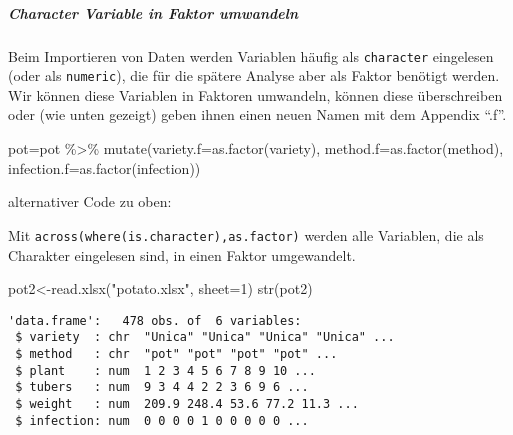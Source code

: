 \documentclass[
  letterpaper,
  DIV=11,
  numbers=noendperiod]{scrartcl}
\let\oldsubparagraph\subparagraph
\renewcommand{\subparagraph}[1]{\oldsubparagraph{#1}\mbox{}}
\newenvironment{Shaded}{\begin{snugshade}}{\end{snugshade}}
\newcommand{\AttributeTok}[1]{\textcolor[rgb]{0.40,0.45,0.13}{#1}}
\newcommand{\DecValTok}[1]{\textcolor[rgb]{0.68,0.00,0.00}{#1}}
\newcommand{\FunctionTok}[1]{\textcolor[rgb]{0.28,0.35,0.67}{#1}}
\newcommand{\NormalTok}[1]{\textcolor[rgb]{0.00,0.23,0.31}{#1}}
\newcommand{\OtherTok}[1]{\textcolor[rgb]{0.00,0.23,0.31}{#1}}
\newcommand{\SpecialCharTok}[1]{\textcolor[rgb]{0.37,0.37,0.37}{#1}}
\newcommand{\StringTok}[1]{\textcolor[rgb]{0.13,0.47,0.30}{#1}}
\begin{document}
\hypertarget{sec-mutate}{%
\subparagraph{Character Variable in Faktor umwandeln}\label{sec-mutate}}

Beim Importieren von Daten werden Variablen häufig als
\texttt{character} eingelesen (oder als \texttt{numeric}), die für die
spätere Analyse aber als Faktor benötigt werden. Wir können diese
Variablen in Faktoren umwandeln, können diese überschreiben oder (wie
unten gezeigt) geben ihnen einen neuen Namen mit dem Appendix ``.f''.

\begin{Shaded}
\begin{Highlighting}[]
\NormalTok{pot}\OtherTok{=}\NormalTok{pot }\SpecialCharTok{\%\textgreater{}\%} 
    \FunctionTok{mutate}\NormalTok{(}\AttributeTok{variety.f=}\FunctionTok{as.factor}\NormalTok{(variety),}
           \AttributeTok{method.f=}\FunctionTok{as.factor}\NormalTok{(method),}
           \AttributeTok{infection.f=}\FunctionTok{as.factor}\NormalTok{(infection))}
\end{Highlighting}
\end{Shaded}

alternativer Code zu oben:

\begin{Shaded}
\end{Shaded}

Mit \texttt{across(where(is.character),as.factor)} werden alle
Variablen, die als Charakter eingelesen sind, in einen Faktor
umgewandelt.

\begin{Shaded}
\begin{Highlighting}[]
\NormalTok{pot2}\OtherTok{\textless{}{-}}\FunctionTok{read.xlsx}\NormalTok{(}\StringTok{"potato.xlsx"}\NormalTok{, }\AttributeTok{sheet=}\DecValTok{1}\NormalTok{)}
\FunctionTok{str}\NormalTok{(pot2)}
\end{Highlighting}
\end{Shaded}

\begin{verbatim}
'data.frame':   478 obs. of  6 variables:
 $ variety  : chr  "Unica" "Unica" "Unica" "Unica" ...
 $ method   : chr  "pot" "pot" "pot" "pot" ...
 $ plant    : num  1 2 3 4 5 6 7 8 9 10 ...
 $ tubers   : num  9 3 4 4 2 2 3 6 9 6 ...
 $ weight   : num  209.9 248.4 53.6 77.2 11.3 ...
 $ infection: num  0 0 0 0 1 0 0 0 0 0 ...
\end{verbatim}
\end{document}
